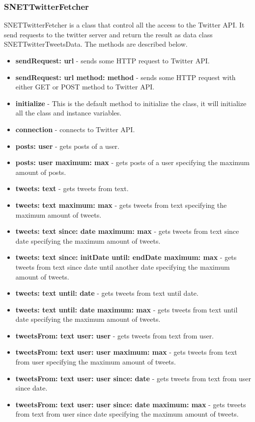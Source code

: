 \subsubsection{SNETTwitterFetcher}
\label{sec-1-4-3}
SNETTwitterFetcher is a class that control all the access to the Twitter API.
It send requests to the twitter server and return the result as data class SNETTwitterTweetsData.
The methods are described below.
\begin{itemize}
\item \textbf{sendRequest: url} - sends some HTTP request to Twitter API.
\item \textbf{sendRequest: url method: method} - sends some HTTP request with either GET or POST method to Twitter API.
\item \textbf{initialize} - This is the default method to initialize the class, it will initialize all the class and instance variables.
\item \textbf{connection} - connects to Twitter API.
\item \textbf{posts: user} - gets posts of a user.
\item \textbf{posts: user maximum: max} - gets posts of a user specifying the maximum amount of posts.
\item \textbf{tweets: text} - gets tweets from text.
\item \textbf{tweets: text maximum: max} - gets tweets from text specifying the maximum amount of tweets.
\item \textbf{tweets: text since: date maximum: max} - gets tweets from text since date specifying the maximum amount of tweets.
\item \textbf{tweets: text since: initDate until: endDate maximum: max} - gets tweets from text since date until another date specifying the maximum amount of tweets.
\item \textbf{tweets: text until: date} - gets tweets from text until date.
\item \textbf{tweets: text until: date maximum: max} - gets tweets from text until date specifying the maximum amount of tweets.
\item \textbf{tweetsFrom: text user: user} - gets tweets from text from user.
\item \textbf{tweetsFrom: text user: user maximum: max} - gets tweets from text from user specifying the maximum amount of tweets.
\item \textbf{tweetsFrom: text user: user since: date} - gets tweets from text from user since date.
\item \textbf{tweetsFrom: text user: user since: date maximum: max} - gets tweets from text from user since date specifying the maximum amount of tweets.

\end{itemize}
